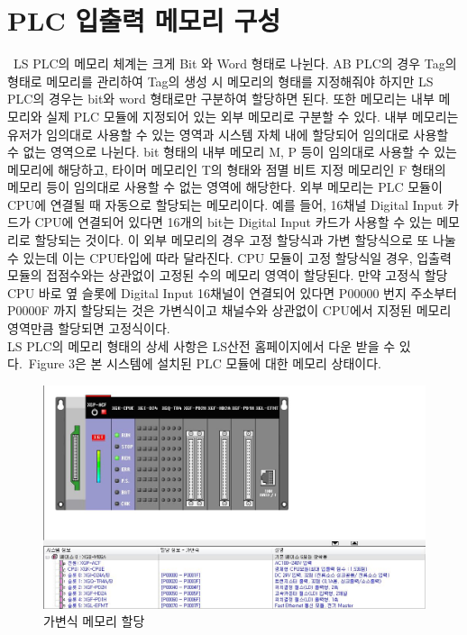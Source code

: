 \documentclass[11pt
  , a4paper
  , article
  , oneside
]{memoir}
\begin{document}
\section{PLC 입출력 메모리 구성}\
 LS PLC의 메모리 체계는 크게 Bit 와 Word 형태로 나뉜다. AB PLC의 경우 Tag의 형태로 메모리를 관리하여 Tag의 생성 시 메모리의 형태를 지정해줘야 하지만 LS PLC의 경우는 bit와 word 형태로만 구분하여 할당하면 된다. 또한 메모리는 내부 메모리와 실제 PLC 모듈에 지정되어 있는 외부 메모리로 구분할 수 있다. 내부 메모리는 유저가 임의대로 사용할 수 있는 영역과 시스템 자체 내에 할당되어 임의대로 사용할 수 없는 영역으로 나뉜다. bit 형태의 내부 메모리 M, P 등이 임의대로 사용할 수 있는 메모리에 해당하고, 타이머 메모리인 T의 형태와 점멸 비트 지정 메모리인 F 형태의 메모리 등이 임의대로 사용할 수 없는 영역에 해당한다. 외부 메모리는 PLC 모듈이 CPU에 연결될 때 자동으로 할당되는 메모리이다. 예를 들어, 16채널 Digital Input 카드가 CPU에 연결되어 있다면 16개의 bit는 Digital Input 카드가 사용할 수 있는 메모리로 할당되는 것이다. 이 외부 메모리의 경우 고정 할당식과 가변 할당식으로 또 나눌 수 있는데 이는 CPU타입에 따라 달라진다. CPU 모듈이 고정 할당식일 경우, 입출력 모듈의 접점수와는 상관없이 고정된 수의 메모리 영역이 할당된다. 만약 고정식 할당 CPU 바로 옆 슬롯에 Digital Input 16채널이 연결되어 있다면 P00000 번지 주소부터 P0000F 까지 할당되는 것은 가변식이고 채널수와 상관없이 CPU에서 지정된 메모리 영역만큼 할당되면 고정식이다.\\
 
 LS PLC의 메모리 형태의 상세 사항은 LS산전 홈페이지에서 다운 받을 수 있다.\
 Figure 3은 본 시스템에 설치된 PLC 모듈에 대한 메모리 상태이다.\

\begin{figure}[h]
	\centering
	\includegraphics[width=1 \textwidth]{./picture/memory_assign.JPG}
	\caption{
		가변식 메모리 할당
	}
	\label{fig:}
\end{figure}
\end{document}
